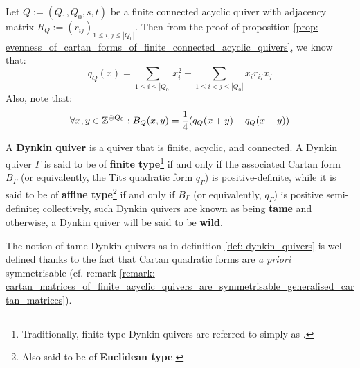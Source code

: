             \begin{remark}
                Let $Q := (Q_1, Q_0, s, t)$ be a finite connected acyclic quiver with adjacency matrix $R_Q := (r_{ij})_{1 \leq i, j \leq |Q_0|}$. Then from the proof of proposition \ref{prop: evenness_of_cartan_forms_of_finite_connected_acyclic_quivers}, we know that:
                    $$q_Q(x) = \sum_{1 \leq i \leq |Q_0|} x_i^2 - \sum_{1 \leq i < j \leq |Q_0|} x_i r_{ij} x_j$$
                Also, note that:
                    $$\forall x, y \in \mathbb{Z}^{\oplus Q_0}: B_Q(x, y) = \frac14(q_Q(x + y) - q_Q(x - y))$$
            \end{remark}
            \begin{definition} \label{def: dynkin_quivers}
                A \textbf{Dynkin quiver} is a quiver that is finite, acyclic, and connected. A Dynkin quiver $\Gamma$ is said to be of \textbf{finite type}\footnote{Traditionally, finite-type Dynkin quivers are referred to simply as .} if and only if the associated Cartan form $B_{\Gamma}$ (or equivalently, the Tits quadratic form $q_{\Gamma}$) is positive-definite, while it is said to be of \textbf{affine type}\footnote{Also said to be of \textbf{Euclidean type}.} if and only if $B_{\Gamma}$ (or equivalently, $q_{\Gamma}$) is positive semi-definite; collectively, such Dynkin quivers are known as being \textbf{tame} and otherwise, a Dynkin quiver will be said to be \textbf{wild}.
            \end{definition}
            \begin{remark}
                The notion of tame Dynkin quivers as in definition \ref{def: dynkin_quivers} is well-defined thanks to the fact that Cartan quadratic forms are \textit{a priori} symmetrisable (cf. remark \ref{remark: cartan_matrices_of_finite_acyclic_quivers_are_symmetrisable_generalised_cartan_matrices}).
            \end{remark}
        
